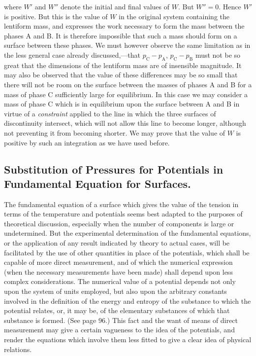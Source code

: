 \documentclass[12pt]{memoir}
\begin{document}
{where $W'$ and $W''$ denote the initial and final values of $W$. But $W''=0$. Hence $W'$ is positive. But this is the value of $W$ in the original system containing the lentiform mass, and expresses the work necessary to form the mass between the phases A and B. It is therefore impossible that such a mass should form on a surface between these phases. We must however observe the same limitation as in the less general case already discussed,---that $p_\text{C}-p_\text{A}$, $p_\text{C}-p_\text{B}$ must not be so great that the dimensions of the lentiform mass are of insensible magnitude. It may also be observed that the value of these differences may be so small that there will not be room on the surface between the masses of phases A and B for a mass of phase C sufficiently large for equilibrium. In this case we may consider a mass of phase C which is in equilibrium upon the surface between A and B in virtue of a \textit{constraint} applied to the line in which the three surfaces of discontinuity intersect, which will not allow this line to become longer, although not preventing it from becoming shorter. We may prove that the value of $W$ is positive by such an integration as we have used before.


\subsection{Substitution of Pressures for Potentials in Fundamental Equation for Surfaces.}
The fundamental equation of a surface which gives the value of the tension in terms of the temperature and potentials seems best adapted to the purposes of theoretical discussion, especially when the number of components is large or undetermined. But the experimental determination of the fundamental equations, or the application of any result indicated by theory to actual cases, will be facilitated by the use of other quantities in place of the potentials, which shall be capable of more direct measurement, and of which the numerical expression (when the necessary measurements have been made) shall depend upon less complex considerations. The numerical value of a potential depends not only upon the system of units employed, but also upon the arbitrary constants involved in the definition of the energy and entropy of the substance to which the potential relates, or, it may be, of the elementary substances of which that substance is formed. (See page 96.) This fact and the want of means of direct measurement may give a certain vagueness to the idea of the potentials, and render the equations which involve them less fitted to give a clear idea of physical relations.

}
\end{document}
